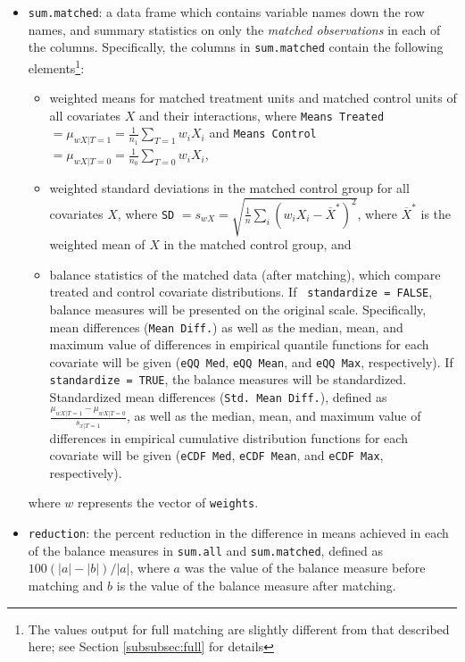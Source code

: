 \begin{itemize}
\item \texttt{sum.matched}: a data frame which contains variable names
  down the row names, and summary statistics on only the \emph{matched
    observations} in each of the columns.  Specifically, the columns
  in \texttt{sum.matched} contain the following elements\footnote{The
    values output for full matching are slightly different from that
    described here; see Section \ref{subsubsec:full} for details}:
  \begin{itemize}
  \item weighted means for matched treatment units and matched control units of all covariates
    $X$ and their interactions, where \texttt{Means Treated}$=
    \mu_{wX|T=1} = \frac{1}{n_1} \sum_{T=1} w_iX_i$ and \texttt{Means
      Control}$=\mu_{wX|T=0} = \frac{1}{n_0} \sum_{T=0} w_iX_i$,
  \item weighted standard deviations in the matched control group for
    all covariates $X$, where \texttt{SD} $= s_{wX} =
    \sqrt{\frac{1}{n} \sum_{i} (w_iX_i - \overline{X}^*)^2}$, where
    $\overline{X}^*$ is the weighted mean of $X$ in the matched
    control group, and
  \item balance statistics of the matched data (after matching), which
    compare treated and control covariate distributions. If {\tt
      standardize = FALSE}, balance measures will be presented on the
    original scale. Specifically, mean differences (\texttt{Mean
      Diff.}) as well as the median, mean, and maximum value of
    differences in empirical quantile functions for each covariate
    will be given (\texttt{eQQ Med}, \texttt{eQQ Mean}, and
    \texttt{eQQ Max}, respectively). If {\tt standardize = TRUE}, the
    balance measures will be standardized.  Standardized mean
    differences (\texttt{Std. Mean Diff.}), defined as
    $\frac{\mu_{wX|T=1} - \mu_{wX|T=0}}{s_{x|T=1}}$, as well as the
    median, mean, and maximum value of differences in empirical
    cumulative distribution functions for each covariate will be given
    (\texttt{eCDF Med}, \texttt{eCDF Mean}, and \texttt{eCDF Max},
    respectively).
  \end{itemize}
  where $w$ represents the vector of \texttt{weights}.
  
\item \texttt{reduction}: the percent reduction in the difference in
  means achieved in each of the balance measures in \texttt{sum.all}
  and \texttt{sum.matched}, defined as $100(|a|-|b|)/|a|$, where $a$
  was the value of the balance measure before matching and $b$ is the
  value of the balance measure after matching.
  

\end{itemize}
